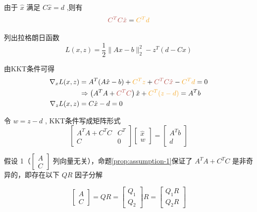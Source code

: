 由于 $ \hat{x} $ 满足 $ C \hat{x}=d $ ,则有 \begin{equation}\displaystyle \textcolor[rgb]{0.72,0.33,0.31}{C^{T} C\hat{x}} =\textcolor[rgb]{0.96,0.65,0.14}{C^{T} d}\end{equation} 

列出拉格朗日函数
\begin{equation}
L(x, z)=\frac{1}{2}\|A x-b\|_{2}^{2}-z^{T}(d-C x)
\end{equation}

由KKT条件可得
\begin{equation}\begin{aligned}
    \nabla _{x} L(x,z) & =A^{T} (A\hat{x} -b)+\textcolor[rgb]{0.96,0.65,0.14}{C^{T} z} +\textcolor[rgb]{0.72,0.33,0.31}{C^{T} C\hat{x}} -\textcolor[rgb]{0.96,0.65,0.14}{C^{T} d} =0\\
     & \Rightarrow \left( A^{T} A+\textcolor[rgb]{0.72,0.33,0.31}{C^{T} C}\right)\hat{x} +\textcolor[rgb]{0.96,0.65,0.14}{C^{T} (z-d)} =A^{T} b\\
    \nabla _{z} L(x,z) & =C\hat{x} -d=0
    \end{aligned}
\end{equation}

令 $ w=z-d $ , KKT条件写成矩阵形式
\begin{equation}
\left[\begin{array}{cc}
A^{T} A+C^{T} C & C^{T} \\
C & 0
\end{array}\right]\left[\begin{array}{l}
\hat{x} \\
w
\end{array}\right]=\left[\begin{array}{c}
A^{T} b \\
d
\end{array}\right]
\end{equation}

假设 1（$ \left[\begin{array}{l}A \\ C\end{array}\right] $ 列向量无关），命题\ref{prop:assumption-1}保证了 $ A^{T} A+C^{T} C $ 是非奇异的，即存在以下 $ Q R $ 因子分解

\begin{equation} \left[\begin{array}{l}A \\ C\end{array}\right]=Q R=\left[\begin{array}{l}Q_{1} \\ Q_{2}\end{array}\right] R=\left[\begin{array}{l}Q_{1} R \\ Q_{2} R\end{array}\right] \end{equation}

